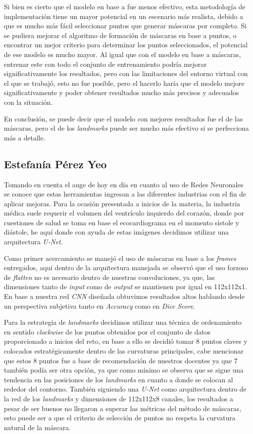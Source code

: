 \documentclass[runningheads]{llncs}
\begin{document}
Si bien es cierto que el modelo en base a  fue menos efectivo, esta metodología de implementación tiene un mayor potencial en un escenario más realista, debido a que es mucho más fácil seleccionar puntos que generar máscaras por completo. Si se pudiera mejorar el algoritmo de formación de máscaras en base a puntos, o encontrar un mejor criterio para determinar los puntos seleccionados, el potencial de ese modelo es mucho mayor. Al igual que con el modelo en base a máscaras, entrenar este con todo el conjunto de entrenamiento podría mejorar significativamente los resultados, pero con las limitaciones del entorno virtual con el que se trabajó, esto no fue posible, pero el hacerlo haría que el modelo mejore significativamente y poder obtener resultados mucho más precisos y adecuados con la situación.

En conclusión, se puede decir que el modelo con mejores resultados fue el de las máscaras, pero el de los \textit{landmarks} puede ser mucho más efectivo si se perfecciona más a detalle. 

\subsection{Estefanía Pérez Yeo}
Tomando en cuenta el auge de hoy en día en cuanto al uso de Redes Neuronales se conoce que estas herramientas ingresan a las diferentes industrias con el fin de aplicar mejoras. Para la ocasión presentada a inicios de la materia, la industria médica suele requerir el volumen del ventrículo izquierdo del corazón, donde por cuestiones de salud se toma en base el ecocardiograma en el momento sístole y diástole, he aquí donde con ayuda de estas imágenes decidimos utilizar una arquitectura \textit{U-Net}.

Como primer acercamiento se manejó el uso de máscaras en base a los \textit{frames} entregados, aquí dentro de la arquitectura manejada se observó que el uso forzoso de \textit{flatten} no es necesario dentro de nuestras convoluciones, ya que, las dimensiones tanto de \textit{input} como de \textit{output} se mantienen por igual en 112x112x1. En base a nuestra red \textit{CNN} diseñada obtuvimos resultados altos hablando desde un perspectiva subjetiva tanto en \textit{Accuracy} como en \textit{Dice Score}.

Para la estrategia de \textit{landmarks} decidimos utilizar una técnica de ordenamiento en sentido \textit{clockwise} de los puntos obtenidos por el conjunto de datos proporcionado a inicios del reto, en base a ello se decidió tomar 8 puntos claves y colocados estratégicamente dentro de las curvaturas principales, cabe mencionar que estos 8 puntos fue a base de recomendación de nuestros docentes ya que 7 también podía ser otra opción, ya que como mínimo se observa que se sigue una tendencia en las posiciones de los \textit{landmarks} en cuanto a donde se colocan al rededor del contorno. También siguiendo una \textit{U-Net} como arquitectura dentro de la red de los \textit{landmarks} y dimensiones de 112x112x8 canales, los resultados a pesar de ser buenos no llegaron a superar las métricas del método de máscaras, esto puede ser a que el criterio de selección de puntos no respeta la curvatura natural de la máscara.
\end{document}
